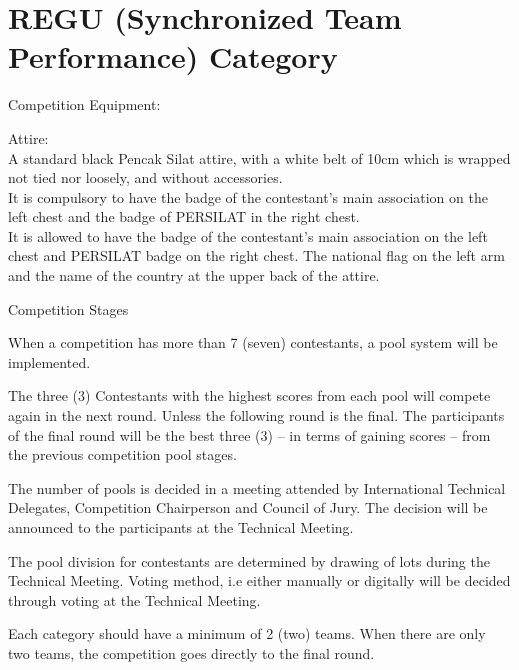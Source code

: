 \section{REGU (Synchronized Team Performance) Category}
\label{sec:regu_category}

\begin{legal}
\item Competition Equipment:
    \begin{legal}
    \item Attire: \\
        A standard black Pencak Silat attire, with a white belt of 10cm which is wrapped not tied nor loosely, and without accessories. \\

        It is compulsory to have the badge of the contestant’s main association on the left chest and the badge of PERSILAT in the right chest. \\

        It is allowed to have the badge of the contestant’s main association on the left chest and PERSILAT badge on the right chest. The national flag on the left arm and the name of the country at the upper back of the attire.
    \end{legal}

\item Competition Stages

    \begin{legal}
        \item When a competition has more than 7 (seven) contestants, a pool system will be implemented.
        \item The three (3) Contestants with the highest scores from each pool will compete again in the next round. Unless the following round is the final.  The participants of the final round will be the best three (3) – in terms of gaining scores – from the previous competition pool stages.
        \item The number of pools is decided in a meeting attended by International Technical Delegates, Competition Chairperson and Council of Jury. The decision will be announced to the participants at the Technical Meeting.
        \item The pool division for contestants are determined by drawing of lots during the Technical Meeting. Voting method, i.e either manually or digitally will be decided through voting at the Technical Meeting.
        \item Each category should have a minimum of 2 (two) teams. When there are only two teams, the competition goes directly to the final round.
        \end{legal}


\end{legal}
